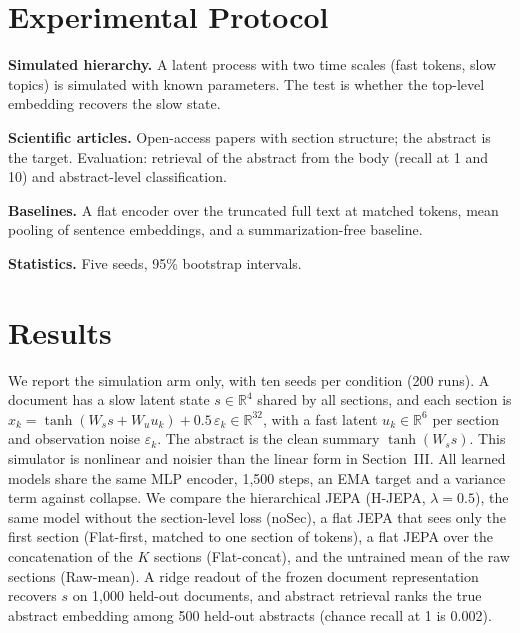 \documentclass[conference]{IEEEtran}
\begin{document}
\section{Experimental Protocol}
\textbf{Simulated hierarchy.} A latent process with two time scales (fast tokens, slow topics) is simulated with known parameters. The test is whether the top-level embedding recovers the slow state.

\textbf{Scientific articles.} Open-access papers with section structure; the abstract is the target. Evaluation: retrieval of the abstract from the body (recall at 1 and 10) and abstract-level classification.

\textbf{Baselines.} A flat encoder over the truncated full text at matched tokens, mean pooling of sentence embeddings, and a summarization-free baseline.

\textbf{Statistics.} Five seeds, 95\% bootstrap intervals.

\section{Results}
We report the simulation arm only, with ten seeds per condition (200 runs). A document has a slow latent state $s\in\mathbb{R}^4$ shared by all sections, and each section is $x_k=\tanh(W_s s+W_u u_k)+0.5\,\varepsilon_k\in\mathbb{R}^{32}$, with a fast latent $u_k\in\mathbb{R}^6$ per section and observation noise $\varepsilon_k$. The abstract is the clean summary $\tanh(W_s s)$. This simulator is nonlinear and noisier than the linear form in Section~III. All learned models share the same MLP encoder, 1{,}500 steps, an EMA target and a variance term against collapse. We compare the hierarchical JEPA (H-JEPA, $\lambda=0.5$), the same model without the section-level loss (noSec), a flat JEPA that sees only the first section (Flat-first, matched to one section of tokens), a flat JEPA over the concatenation of the $K$ sections (Flat-concat), and the untrained mean of the raw sections (Raw-mean). A ridge readout of the frozen document representation recovers $s$ on 1{,}000 held-out documents, and abstract retrieval ranks the true abstract embedding among 500 held-out abstracts (chance recall at 1 is 0.002).
\end{document}
